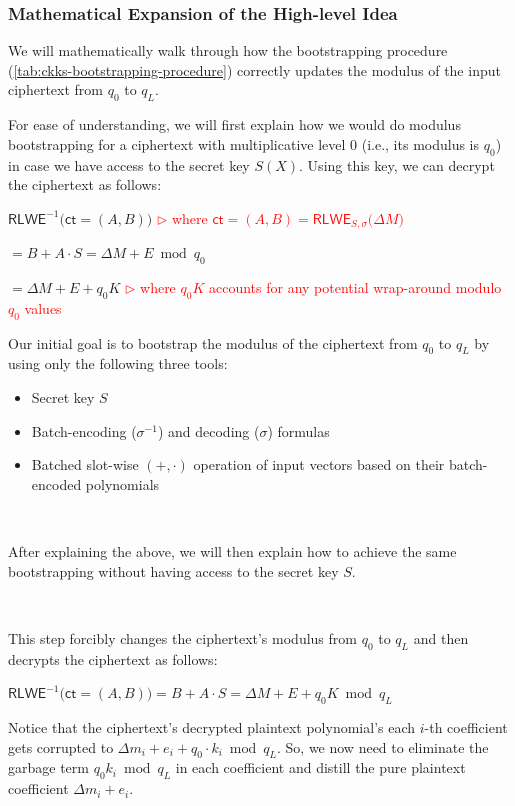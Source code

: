 \subsubsection{Mathematical Expansion of the High-level Idea}
\label{subsubsec:ckks-bootstrapping-high-level-correctness}

We will mathematically walk through how the bootstrapping procedure (\autoref{tab:ckks-bootstrapping-procedure}) correctly updates the modulus of the input ciphertext from $q_0$ to $q_L$. 

For ease of understanding, we will first explain how we would do modulus bootstrapping for a ciphertext with multiplicative level 0 (i.e., its modulus is $q_0$) in case we have access to the secret key $S(X)$. Using this key, we can decrypt the ciphertext as follows:

$\textsf{RLWE}^{-1}\textbf{(}\textsf{ct} = (A, B)\textbf{)}$ \textcolor{red}{ $\rhd$ where $\textsf{ct}=(A, B) = \textsf{RLWE}_{S, \sigma}\bm(\Delta M \bm)$}

$ = B + A\cdot S = \Delta M + E \bmod q_0$ 

$ = \Delta M + E + q_0K$ \textcolor{red}{ $\rhd$ where $q_0K$ accounts for any potential wrap-around modulo $q_0$ values}

Our initial goal is to bootstrap the modulus of the ciphertext from $q_0$ to $q_L$ by using only the following three tools:

\begin{itemize}
\item Secret key $S$
\item Batch-encoding ($\sigma^{-1}$) and decoding ($\sigma$) formulas
\item Batched slot-wise $(+, \cdot)$ operation of input vectors based on their batch-encoded polynomials
\end{itemize}

$ $

After explaining the above, we will then explain how to achieve the same bootstrapping without having access to the secret key $S$. 


$ $

 This step forcibly changes the ciphertext's modulus from $q_0$ to $q_L$ and then decrypts the ciphertext as follows:

$\textsf{RLWE}^{-1}\textbf{(}\textsf{ct} = (A, B)\textbf{)} = B + A\cdot S = \Delta M + E + q_0 K \bmod q_L$

Notice that the ciphertext's decrypted plaintext polynomial's each $i$-th coefficient gets corrupted to $\Delta m_i + e_i + q_0\cdot k_i \bmod q_L$. So, we now need to eliminate the garbage term $q_0k_i \bmod q_L$ in each coefficient and distill the pure plaintext coefficient $\Delta m_i + e_i$. 

